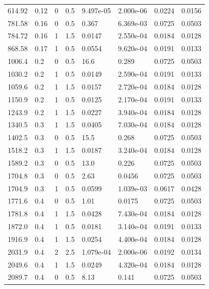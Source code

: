 \documentclass[preview]{standalone}
\begin{document}
{{\begin{tabular}{L{1.2cm}C{1.2cm} C{0.3cm}C{0.5cm} C{1.4cm}C{1.4cm} C{1.4cm}C{1.4cm}}
  614.92  &  0.12  & 0     & 0.5 &  9.497e-05  & 2.000e-06  & 0.0224 &  0.0156   \\ 
  781.58  &  0.16  & 0     & 0.5 &  0.367  & 6.369e-03  & 0.0725 &  0.0503   \\ 
  784.72  &  0.16  & 1     & 1.5 &  0.0147  & 2.550e-04  & 0.0184 &  0.0128   \\ 
  868.58  &  0.17  & 1     & 0.5 &  0.0554  & 9.620e-04  & 0.0191 &  0.0133   \\ 
  1006.4  &   0.2  & 0     & 0.5 &  16.6  & 0.289  & 0.0725 &  0.0503   \\ 
  1030.2  &   0.2  & 1     & 0.5 &  0.0149  & 2.590e-04  & 0.0191 &  0.0133   \\ 
  1059.6  &   0.2  & 1     & 1.5 &  0.0157  & 2.720e-04  & 0.0184 &  0.0128   \\ 
  1150.9  &   0.2  & 1     & 0.5 &  0.0125  & 2.170e-04  & 0.0191 &  0.0133   \\ 
  1243.9  &   0.2  & 1     & 1.5 &  0.0227  & 3.940e-04  & 0.0184 &  0.0128   \\ 
  1340.5  &   0.3  & 1     & 1.5 &  0.0405  & 7.030e-04  & 0.0184 &  0.0128   \\ 
  1402.5  &   0.3  & 0     & 0.5 &  15.5  & 0.268  & 0.0725 &  0.0503   \\ 
  1518.2  &   0.3  & 1     & 1.5 &  0.0187  & 3.240e-04  & 0.0184 &  0.0128   \\ 
  1589.2  &   0.3  & 0     & 0.5 &  13.0  & 0.226  & 0.0725 &  0.0503   \\ 
  1704.8  &   0.3  & 0     & 0.5 &  2.63  & 0.0456  & 0.0725 &  0.0503   \\ 
  1704.9  &   0.3  & 1     & 0.5 &  0.0599  & 1.039e-03  & 0.0617 &  0.0428   \\ 
  1771.6  &   0.4  & 0     & 0.5 &  1.01  & 0.0175  & 0.0725 &  0.0503   \\ 
  1781.8  &   0.4  & 1     & 1.5 &  0.0428  & 7.430e-04  & 0.0184 &  0.0128   \\ 
  1872.0  &   0.4  & 1     & 0.5 &  0.0181  & 3.140e-04  & 0.0191 &  0.0133   \\ 
  1916.9  &   0.4  & 1     & 1.5 &  0.0254  & 4.400e-04  & 0.0184 &  0.0128   \\ 
  2031.9  &   0.4  & 2     & 2.5 &  1.079e-04  & 2.000e-06  & 0.0192 &  0.0134   \\ 
  2049.6  &   0.4  & 1     & 1.5 &  0.0249  & 4.320e-04  & 0.0184 &  0.0128   \\ 
  2089.7  &   0.4  & 0     & 0.5 &  8.13  & 0.141  & 0.0725 &  0.0503   \\ 

\end{tabular}}}
\end{document}
